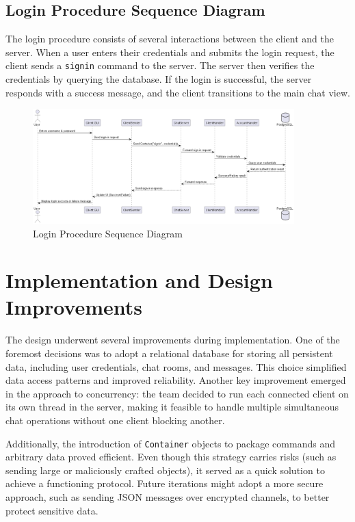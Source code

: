 \documentclass[12pt,a4paper]{report}
\begin{document}
\section{Login Procedure Sequence Diagram}
The login procedure consists of several interactions between the client and the
server. When a user enters their credentials and submits the login request, the
client sends a \texttt{signin} command to the server. The server then verifies
the credentials by querying the database. If the login is successful, the
server responds with a success message, and the client transitions to the main
chat view.

\begin{figure}[H]
  \centering
  \includegraphics[width=0.9\textwidth]{signin.png}
  \caption{Login Procedure Sequence Diagram}
  \label{fig:login_sequence_diagram}
\end{figure}

\chapter{Implementation and Design Improvements}
The design underwent several improvements during implementation. One of the
foremost decisions was to adopt a relational database for storing all
persistent data, including user credentials, chat rooms, and messages. This
choice simplified data access patterns and improved reliability. Another key
improvement emerged in the approach to concurrency: the team decided to run
each connected client on its own thread in the server, making it feasible to
handle multiple simultaneous chat operations without one client blocking
another.

Additionally, the introduction of \texttt{Container} objects to package
commands and arbitrary data proved efficient. Even though this strategy carries
risks (such as sending large or maliciously crafted objects), it served as a
quick solution to achieve a functioning protocol. Future iterations might adopt
a more secure approach, such as sending JSON messages over encrypted channels,
to better protect sensitive data.
\end{document}
